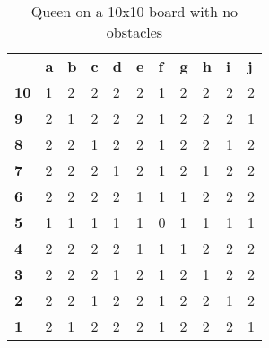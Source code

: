 \documentclass{article}
\begin{document}
\begin{table}[H]
\centering
\caption{Queen on a 10x10 board with no obstacles}
\label{my-label}
\begin{tabular}{lllllllllll}
                                 & \textbf{a} & \textbf{b} & \textbf{c} & \textbf{d} & \textbf{e} & \textbf{f} & \textbf{g} & \textbf{h} & \textbf{i} & \textbf{j} \\ \cline{2-11} 
\multicolumn{1}{l|}{\textbf{10}} & 1          & 2          & 2          & 2          & 2          & 1          & 2          & 2          & 2          & 2          \\
\multicolumn{1}{l|}{\textbf{9}} & 2          & 1          & 2          & 2          & 2          & 1          & 2          & 2          & 2          & 1          \\
\multicolumn{1}{l|}{\textbf{8}} & 2          & 2          & 1          & 2          & 2          & 1          & 2          & 2          & 1          & 2          \\
\multicolumn{1}{l|}{\textbf{7}} & 2          & 2          & 2          & 1          & 2          & 1          & 2          & 1          & 2          & 2          \\
\multicolumn{1}{l|}{\textbf{6}} & 2          & 2          & 2          & 2          & 1          & 1          & 1          & 2          & 2          & 2          \\
\multicolumn{1}{l|}{\textbf{5}} & 1          & 1          & 1          & 1          & 1          & 0          & 1          & 1          & 1          & 1          \\
\multicolumn{1}{l|}{\textbf{4}}  & 2          & 2          & 2          & 2          & 1          & 1          & 1          & 2          & 2          & 2          \\
\multicolumn{1}{l|}{\textbf{3}}  & 2          & 2          & 2          & 1          & 2          & 1          & 2          & 1          & 2          & 2          \\
\multicolumn{1}{l|}{\textbf{2}}  & 2          & 2          & 1          & 2          & 2          & 1          & 2          & 2          & 1          & 2          \\
\multicolumn{1}{l|}{\textbf{1}}  & 2          & 1          & 2          & 2          & 2          & 1          & 2          & 2          & 2          & 1         
\end{tabular}
\end{table}
\end{document}
